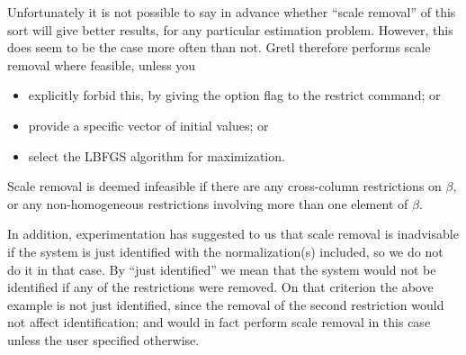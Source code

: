 Unfortunately it is not possible to say in advance whether ``scale
removal'' of this sort will give better results, for any particular
estimation problem.  However, this does seem to be the case more often
than not.  Gretl therefore performs scale removal where feasible,
unless you
\begin{itemize}
\item explicitly forbid this, by giving the  option
  flag to the restrict command; or
\item provide a specific vector of initial values; or
\item select the LBFGS algorithm for maximization.
\end{itemize}

Scale removal is deemed infeasible if there are any cross-column
restrictions on $\beta$, or any non-homogeneous restrictions involving
more than one element of $\beta$.  

In addition, experimentation has suggested to us that scale removal is
inadvisable if the system is just identified with the normalization(s)
included, so we do not do it in that case.  By ``just identified'' we
mean that the system would not be identified if any of the
restrictions were removed.  On that criterion the above example is not
just identified, since the removal of the second restriction would not
affect identification; and  would in fact perform scale
removal in this case unless the user specified otherwise.

